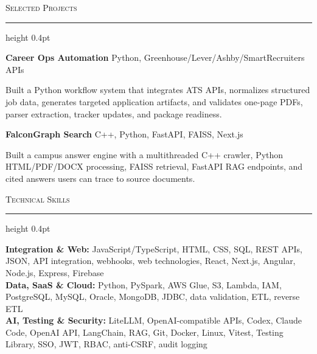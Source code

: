 \documentclass[letterpaper,11pt]{article}
\newcommand{\resumesection}[1]{%
  \par\vspace{2pt}%
  {\large\scshape #1}\par\vspace{2pt}%
  \hrule height 0.4pt\vspace{2pt}%
}
\newcommand{\projectHeading}[2]{
  \textbf{#1} \hfill #2
}
\begin{document}
\resumesection{Selected Projects}
\projectHeading{Career Ops Automation}{Python, Greenhouse/Lever/Ashby/SmartRecruiters APIs}
\begin{tightitemize}
  \item Built a Python workflow system that integrates ATS APIs, normalizes structured job data, generates targeted application artifacts, and validates one-page PDFs, parser extraction, tracker updates, and package readiness.
\end{tightitemize}

\projectHeading{FalconGraph Search}{C++, Python, FastAPI, FAISS, Next.js}
\begin{tightitemize}
  \item Built a campus answer engine with a multithreaded C++ crawler, Python HTML/PDF/DOCX processing, FAISS retrieval, FastAPI RAG endpoints, and cited answers users can trace to source documents.
\end{tightitemize}

\resumesection{Technical Skills}
\textbf{Integration \& Web:} JavaScript/TypeScript, HTML, CSS, SQL, REST APIs, JSON, API integration, webhooks, web technologies, React, Next.js, Angular, Node.js, Express, Firebase\\
\textbf{Data, SaaS \& Cloud:} Python, PySpark, AWS Glue, S3, Lambda, IAM, PostgreSQL, MySQL, Oracle, MongoDB, JDBC, data validation, ETL, reverse ETL\\
\textbf{AI, Testing \& Security:} LiteLLM, OpenAI-compatible APIs, Codex, Claude Code, OpenAI API, LangChain, RAG, Git, Docker, Linux, Vitest, Testing Library, SSO, JWT, RBAC, anti-CSRF, audit logging
\end{document}
